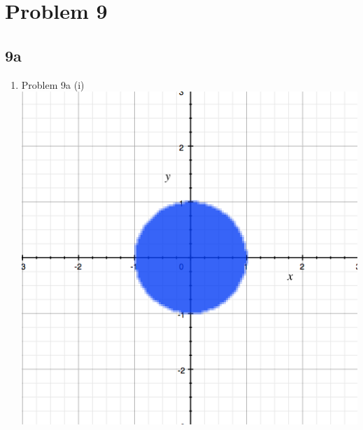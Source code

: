 \documentclass[11pt]{article}
\newcommand{\solution}[1]{{{\color{blue}{\bf Solution:} {#1}}}}
\begin{document}
\newpage
\section{Problem 9}
\subsection{9a}
\begin{enumerate}
\item Problem 9a (i)
\solution{}
\newline
\includegraphics[scale=0.4]{9a(i)}

\end{enumerate}
\end{document}
